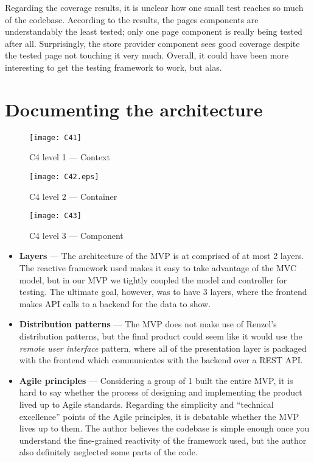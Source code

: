 Regarding the coverage results,
it is unclear how one small test
reaches so much of the codebase.
According to the results,
the pages components are understandably the least tested;
only one page component is really being tested after all.
Surprisingly, the store provider component sees good coverage
despite the tested page not touching it very much.
Overall, it could have been more interesting to get the testing framework to work,
but alas.

\section*{Documenting the architecture}

\begin{figure}[h]
	\centering
	\texttt{[image: C41]}
	\caption{C4 level 1 --- Context}
\end{figure}

\begin{figure}[h]
	\centering
	\texttt{[image: C42.eps]}
	\caption{C4 level 2 --- Container}
\end{figure}

\begin{figure}[h]
	\centering
	\texttt{[image: C43]}
	\caption{C4 level 3 --- Component}
\end{figure}

\begin{itemize}
	\item \textbf{Layers} ---
	      The architecture of the MVP is at comprised of at most 2 layers.
	      The reactive framework used makes it easy to take advantage of the MVC model,
	      but in our MVP we tightly coupled the model and controller for testing.
	      The ultimate goal, however, was to have 3 layers,
	      where the frontend makes API calls to a backend for the data to show.
	\item \textbf{Distribution patterns} ---
	      The MVP does not make use of Renzel's distribution patterns,
	      but the final product could seem like it would use the
	      \emph{remote user interface} pattern,
	      where all of the presentation layer is packaged with the frontend
	      which communicates with the backend over a REST API.

	\item \textbf{Agile principles} ---
	      Considering a group of 1 built the entire MVP,
	      it is hard to say whether the process
	      of designing and implementing the product
	      lived up to Agile standards.
	      Regarding the simplicity and ``technical excellence''
	      points of the Agile principles,
	      it is debatable whether the MVP lives up to them.
	      The author believes the codebase is simple enough
	      once you understand the fine-grained reactivity of the framework used,
	      but the author also definitely neglected some parts of the code.
\end{itemize}

